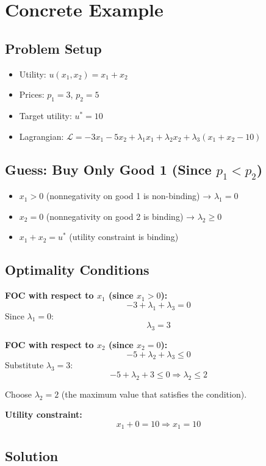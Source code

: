 \documentclass[11pt]{article}
\begin{document}
\section{Concrete Example}

\subsection{Problem Setup}

\begin{itemize}
\item Utility: $u(x_1, x_2) = x_1 + x_2$
\item Prices: $p_1 = 3$, $p_2 = 5$
\item Target utility: $u^* = 10$
\item Lagrangian: $\mathcal{L} = -3x_1 - 5x_2 + \lambda_1 x_1 + \lambda_2 x_2 + \lambda_3(x_1 + x_2 - 10)$
\end{itemize}

\subsection{Guess: Buy Only Good 1 (Since $p_1 < p_2$)}

\begin{itemize}
\item $x_1 > 0$ (nonnegativity on good 1 is non-binding) → $\lambda_1 = 0$
\item $x_2 = 0$ (nonnegativity on good 2 is binding) → $\lambda_2 \geq 0$
\item $x_1 + x_2 = u^*$ (utility constraint is binding)
\end{itemize}

\subsection{Optimality Conditions}

\textbf{FOC with respect to $x_1$ (since $x_1 > 0$):}
$$-3 + \lambda_1 + \lambda_3 = 0$$
Since $\lambda_1 = 0$:
$$\lambda_3 = 3$$

\textbf{FOC with respect to $x_2$ (since $x_2 = 0$):}
$$-5 + \lambda_2 + \lambda_3 \leq 0$$
Substitute $\lambda_3 = 3$:
$$-5 + \lambda_2 + 3 \leq 0 \Rightarrow \lambda_2 \leq 2$$

Choose $\lambda_2 = 2$ (the maximum value that satisfies the condition).

\textbf{Utility constraint:}
$$x_1 + 0 = 10 \Rightarrow x_1 = 10$$

\subsection{Solution}
\end{document}
